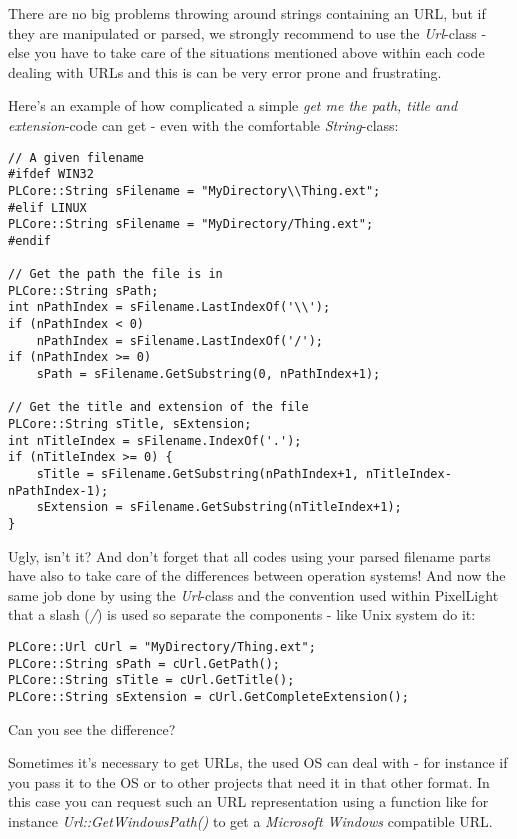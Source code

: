 There are no big problems throwing around strings containing an \ac{URL}, but if they are manipulated or parsed, we strongly recommend to use the \emph{Url}-class - else you have to take care of the situations mentioned above within each code dealing with \ac{URL}s and this is can be very error prone and frustrating.

Here's an example of how complicated a simple \emph{get me the path, title and extension}-code can get - even with the comfortable \emph{String}-class:

\begin{lstlisting}[caption=File path\, title and extension without using the Url-class]
// A given filename
#ifdef WIN32
PLCore::String sFilename = "MyDirectory\\Thing.ext";
#elif LINUX
PLCore::String sFilename = "MyDirectory/Thing.ext";
#endif

// Get the path the file is in
PLCore::String sPath;
int nPathIndex = sFilename.LastIndexOf('\\');
if (nPathIndex < 0)
	nPathIndex = sFilename.LastIndexOf('/');
if (nPathIndex >= 0)
	sPath = sFilename.GetSubstring(0, nPathIndex+1);

// Get the title and extension of the file
PLCore::String sTitle, sExtension;
int nTitleIndex = sFilename.IndexOf('.');
if (nTitleIndex >= 0) {
	sTitle = sFilename.GetSubstring(nPathIndex+1, nTitleIndex-nPathIndex-1);
	sExtension = sFilename.GetSubstring(nTitleIndex+1);
}
\end{lstlisting}

Ugly, isn't it? And don't forget that all codes using your parsed filename parts have also to take care of the differences between operation systems! And now the same job done by using the \emph{Url}-class and the convention used within PixelLight that a slash (\emph{/}) is used so separate the components - like Unix system do it:

\begin{lstlisting}[caption=File path\, title and extension using the Url class]
PLCore::Url cUrl = "MyDirectory/Thing.ext";
PLCore::String sPath = cUrl.GetPath();
PLCore::String sTitle = cUrl.GetTitle();
PLCore::String sExtension = cUrl.GetCompleteExtension();
\end{lstlisting}

Can you see the difference?

Sometimes it's necessary to get \ac{URL}s, the used \ac{OS} can deal with - for instance if you pass it to the \ac{OS} or to other projects that need it in that other format. In this case you can request such an \ac{URL} representation using a function like for instance \emph{Url::GetWindowsPath()} to get a \emph{Microsoft Windows} compatible \ac{URL}.

